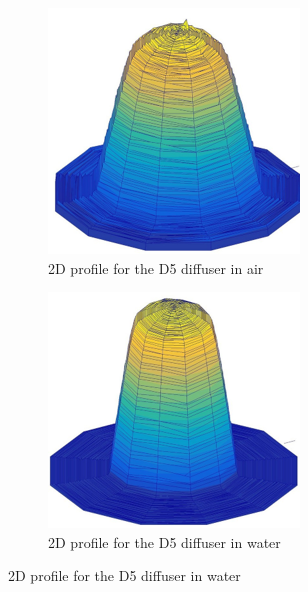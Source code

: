 \begin{figure}
    \centering
     \begin{subfigure}[b]{0.45\linewidth}
      \includegraphics[width=\linewidth]{Figures/D5_sheff_2D_air.PNG}
      \caption{2D profile for the D5 diffuser in air}
      \label{fig:D5_sheff_2D_air} 
     \end{subfigure}
     \begin{subfigure}[b]{0.45\linewidth}
       \includegraphics[width=\linewidth]{Figures/D5_sheff_2D_water.PNG}
        \caption{2D profile for the D5 diffuser in water} 
     \label{fig:D5_sheff_2D_water}
      \end{subfigure} 
\end{figure}

